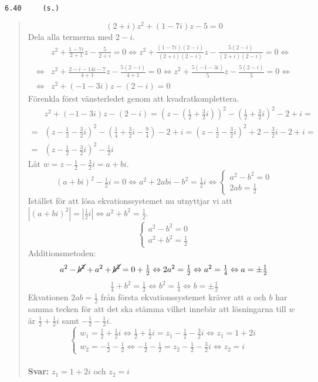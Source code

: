 \documentclass[a4paper]{article}
\newcommand{\tskcol}[1]{\textcolor{tskcol}{#1}}
\begin{document}
	\pagebreak
	\texttt{\tskcol{6.40~~~~ (s.)}}
	\begin{quotation}
		\noindent
		\[(2+i)z^2+(1-7i)z-5=0\]
		Dela alla termerna med $2-i$.
		\begin{align*}
		&z^2+\frac{1-7i}{2+1}z-\frac{5}{2+i}=0 \Leftrightarrow
		z^2+\frac{(1-7i)(2-i)}{(2+i)(2-i)}z-\frac{5(2-i)}{(2+i)(2-i)}=0 \Leftrightarrow \\ \Leftrightarrow
		&z^2+\frac{2-i-14i-7}{4+1}z-\frac{5(2-i)}{4+1}=0 \Leftrightarrow
		z^2+\frac{5(-1-3i)}{5}z-\frac{5(2-i)}{5}=0 \Leftrightarrow \\ \Leftrightarrow
		&z^2+(-1-3i)z-(2-i)=0
		\end{align*}
		Förenkla först vänsterledet genom att kvadratkomplettera.
		\begin{align*}
		&z^2+(-1-3i)z-(2-i)=
		(z-(\tfrac{1}{2}+\tfrac{3}{2}i))^2-(\tfrac{1}{2}+\tfrac{3}{2}i)^2-2+i= \\ =
		&(z-\tfrac{1}{2}-\tfrac{3}{2}i)^2-(\tfrac{1}{4}+\tfrac{3}{2}i-\tfrac{9}{4})-2+i=
		(z-\tfrac{1}{2}-\tfrac{3}{2}i)^2+2-\tfrac{3}{2}i-2+i= \\ =
		&(z-\tfrac{1}{2}-\tfrac{3}{2}i)^2-\tfrac{1}{2}i
		\end{align*}
		Låt $w=z-\tfrac{1}{2}-\tfrac{3}{2}i=a+bi$.
		\[(a+bi)^2-\tfrac{1}{2}i=0 \Leftrightarrow
		a^2+2abi-b^2=\tfrac{1}{2}i\Leftrightarrow
		\begin{cases}
		a^2-b^2=0 \\
		2ab=\tfrac{1}{2}
		\end{cases}\]
		Istället för att lösa ekvationssystemet nu utnyttjar vi  att $|(a+bi)^2|=|\tfrac{1}{2}i| \Leftrightarrow a^2+b^2=\tfrac{1}{2}$.
		\[\begin{cases}
		a^2-b^2 = 0 \\
		a^2+b^2 = \tfrac{1}{2}
		\end{cases}\]
		Additionsmetoden:
		\[a^2-\cancel{b^2}+a^2+\cancel{b^2} = 0+\tfrac{1}{2} \Leftrightarrow
		2a^2=\tfrac{1}{2} \Leftrightarrow
		a^2=\tfrac{1}{4} \Leftrightarrow
		a=\pm\tfrac{1}{2}\]
		\[\tfrac{1}{4}+b^2=\tfrac{1}{2} \Leftrightarrow
		b^2=\tfrac{1}{4} \Leftrightarrow
		b=\pm \tfrac{1}{2}\]
		Ekvationen $2ab=\tfrac{1}{2}$ från första ekvationssystemet kräver att $a$ och $b$ har samma tecken för att det ska stämma vilket innebär att lösningarna till $w$ är $\tfrac{1}{2}+\tfrac{1}{2}i$ samt $-\tfrac{1}{2}-\tfrac{1}{2}i$.
		\[\begin{cases}
		w_1=\tfrac{1}{2}+\tfrac{1}{2}i \Leftrightarrow \tfrac{1}{2}+\tfrac{1}{2}i=z_1-\tfrac{1}{2}-\tfrac{3}{2}i \Leftrightarrow z_1=1+2i \\
		w_2=-\tfrac{1}{2}-\tfrac{1}{2} \Leftrightarrow -\tfrac{1}{2}-\tfrac{1}{2}=z_2-\tfrac{1}{2}-\tfrac{3}{2}i \Leftrightarrow z_2=i
		\end{cases}\]
		\\
		\textbf{Svar:} $z_1=1+2i$ och $z_2=i$
	\end{quotation}
	
\end{document}
